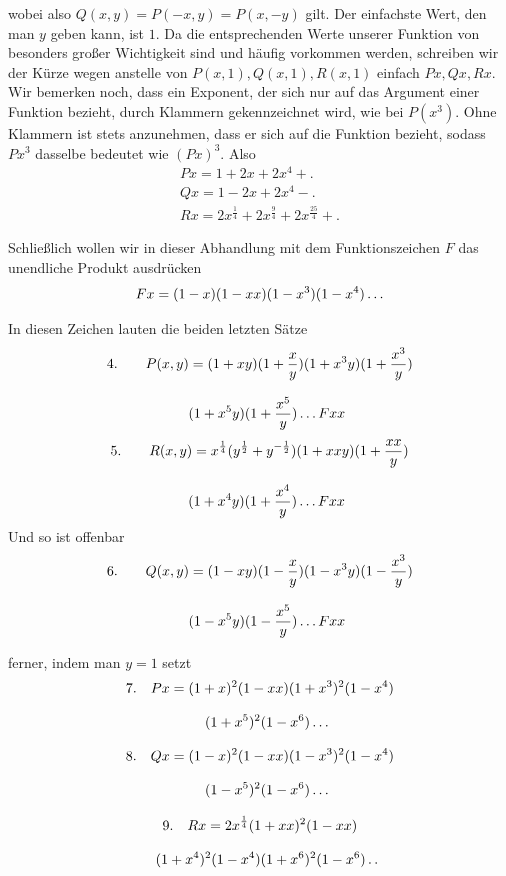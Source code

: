 wobei also $Q(x,y)=P(-x,y)=P(x,-y)$ gilt. Der einfachste Wert, den man $y$ geben kann, ist $1$. Da die entsprechenden Werte unserer Funktion von besonders großer Wichtigkeit sind und häufig vorkommen werden, schreiben wir der Kürze wegen anstelle von $P(x,1),Q(x,1),R(x,1)$ einfach $Px,Qx,Rx$. Wir bemerken noch, dass ein Exponent, der sich nur auf das Argument einer Funktion bezieht, durch Klammern gekennzeichnet wird, wie bei $P(x^3)$. Ohne Klammern ist stets anzunehmen, dass er sich auf die Funktion bezieht, sodass $Px^3$ dasselbe bedeutet wie $(Px)^3$. Also
\[
\begin{gathered}
Px=1+2x+2x^4+\mathord{.}\\[8pt]
Qx=1-2x+2x^4-\mathord{.}\\[8pt]
Rx=2x^{\frac14}+2x^{\frac94}+2x^{\frac{25}4}+\mathord{.}
\end{gathered}
\]

Schließlich wollen wir in dieser Abhandlung mit dem Funktionszeichen $F$ das unendliche Produkt ausdrücken
\[
Fx=(1-x)(1-xx)(1-x^3)(1-x^4)\mathinner{.\,.\,.}
\]

In diesen Zeichen lauten die beiden letzten Sätze
\[
\begin{gathered}\text{4.}\qquad P(x,y)=(1+xy)(1+\frac xy)(1+x^3y)(1+\frac{x^3}y)\\[8pt]\quad{}(1+x^5y)(1+\frac{x^5}y)\mathinner{.\,.\,.} Fxx\end{gathered}
\]
\[
\begin{gathered}\text{5.}\qquad R(x,y)=x^{\frac14}(y^{\frac12}+y^{-\frac12})(1+xxy)(1+\frac{xx}y)\\[8pt]\quad{}(1+x^4y)(1+\frac{x^4}y)\mathinner{.\,.\,.} Fxx\end{gathered}
\]
Und so ist offenbar
\[
\begin{gathered}\text{6.}\qquad Q(x,y)=(1-xy)(1-\frac xy)(1-x^3y)(1-\frac{x^3}y)\\[8pt]\quad{}(1-x^5y)(1-\frac{x^5}y)\mathinner{.\,.\,.} Fxx\end{gathered}
\]







ferner, indem man $y=1$ setzt
\[
\begin{gathered}
7.\quad Px=(1+x)^2(1-xx)(1+x^3)^2(1-x^4)\\[8pt]\quad{}(1+x^5)^2(1-x^6)\mathinner{.\,.\,.}\\[8pt]
8.\quad Qx=(1-x)^2(1-xx)(1-x^3)^2(1-x^4)\\[8pt]\quad{}(1-x^5)^2(1-x^6)\mathinner{.\,.\,.}\\[8pt]
9.\quad Rx=2x^{\frac14}(1+xx)^2(1-xx)\\[8pt]\quad{}(1+x^4)^2(1-x^4)(1+x^6)^2(1-x^6)\mathinner{.\,.}
\end{gathered}
\]

